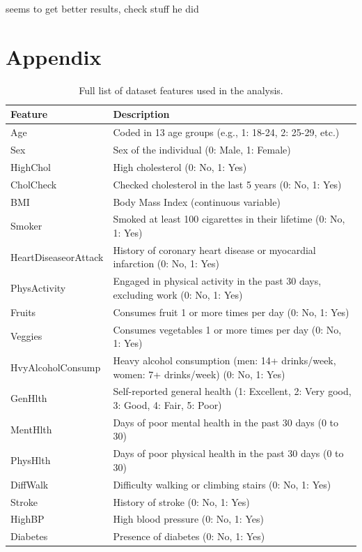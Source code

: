 \documentclass[a4paper,12pt]{article}
\begin{document}
seems to get better results, check stuff he did

\clearpage

\appendix
\section*{Appendix}

\begin{table}[h!]
    \centering
    \begin{tabularx}{\textwidth}{|l|X|}
    \hline
    \textbf{Feature} & \textbf{Description} \\ \hline
    Age & Coded in 13 age groups (e.g., 1: 18-24, 2: 25-29, etc.) \\ \hline
    Sex & Sex of the individual (0: Male, 1: Female) \\ \hline
    HighChol & High cholesterol (0: No, 1: Yes) \\ \hline
    CholCheck & Checked cholesterol in the last 5 years (0: No, 1: Yes) \\ \hline
    BMI & Body Mass Index (continuous variable) \\ \hline
    Smoker & Smoked at least 100 cigarettes in their lifetime (0: No, 1: Yes) \\ \hline
    HeartDiseaseorAttack & History of coronary heart disease or myocardial infarction (0: No, 1: Yes) \\ \hline
    PhysActivity & Engaged in physical activity in the past 30 days, excluding work (0: No, 1: Yes) \\ \hline
    Fruits & Consumes fruit 1 or more times per day (0: No, 1: Yes) \\ \hline
    Veggies & Consumes vegetables 1 or more times per day (0: No, 1: Yes) \\ \hline
    HvyAlcoholConsump & Heavy alcohol consumption (men: 14+ drinks/week, women: 7+ drinks/week) (0: No, 1: Yes) \\ \hline
    GenHlth & Self-reported general health (1: Excellent, 2: Very good, 3: Good, 4: Fair, 5: Poor) \\ \hline
    MentHlth & Days of poor mental health in the past 30 days (0 to 30) \\ \hline
    PhysHlth & Days of poor physical health in the past 30 days (0 to 30) \\ \hline
    DiffWalk & Difficulty walking or climbing stairs (0: No, 1: Yes) \\ \hline
    Stroke & History of stroke (0: No, 1: Yes) \\ \hline
    HighBP & High blood pressure (0: No, 1: Yes) \\ \hline
    Diabetes & Presence of diabetes (0: No, 1: Yes) \\ \hline
    \end{tabularx}
    \caption{Full list of dataset features used in the analysis.}
    \label{tab:feature_list}
\end{table}

\printbibliography
\end{document}
